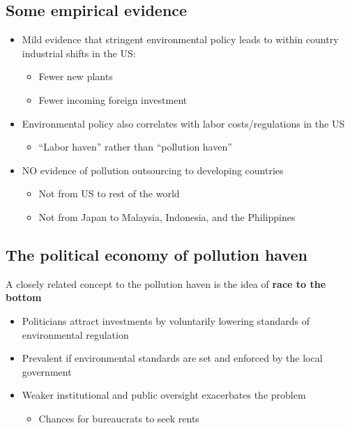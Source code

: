 \documentclass[
]{article}
\providecommand{\tightlist}{%
  \setlength{\itemsep}{0pt}\setlength{\parskip}{0pt}}
\begin{document}
\hypertarget{some-empirical-evidence}{%
\subsection{Some empirical evidence}\label{some-empirical-evidence}}

\begin{itemize}
\tightlist
\item
  Mild evidence that stringent environmental policy leads to within
  country industrial shifts in the US:

  \begin{itemize}
  \tightlist
  \item
    Fewer new plants
  \item
    Fewer incoming foreign investment
  \end{itemize}
\item
  Environmental policy also correlates with labor costs/regulations in
  the US

  \begin{itemize}
  \tightlist
  \item
    ``Labor haven'' rather than ``pollution haven''
  \end{itemize}
\item
  NO evidence of pollution outsourcing to developing countries

  \begin{itemize}
  \tightlist
  \item
    Not from US to rest of the world
  \item
    Not from Japan to Malaysia, Indonesia, and the Philippines
  \end{itemize}
\end{itemize}

\hypertarget{the-political-economy-of-pollution-haven}{%
\subsection{The political economy of pollution
haven}\label{the-political-economy-of-pollution-haven}}

A closely related concept to the pollution haven is the idea of
\textbf{race to the bottom}

\begin{itemize}
\tightlist
\item
  Politicians attract investments by voluntarily lowering standards of
  environmental regulation
\item
  Prevalent if environmental standards are set and enforced by the local
  government
\item
  Weaker institutional and public oversight exacerbates the problem

  \begin{itemize}
  \tightlist
  \item
    Chances for bureaucrats to seek rents
  \end{itemize}
\end{itemize}
\end{document}
